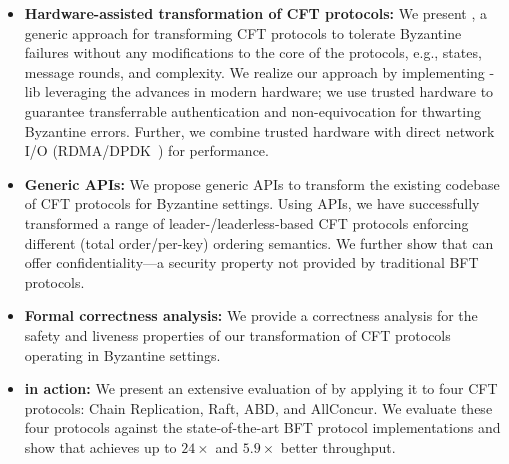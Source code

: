 \begin{itemize}[leftmargin=*]
    \item {\bf Hardware-assisted transformation of CFT protocols:} We present \projecttitle{}, a generic approach for transforming CFT protocols to tolerate Byzantine failures without any modifications to the core of the protocols, e.g., states, message rounds, and complexity. We realize our approach by implementing \projecttitle{}-lib leveraging the advances in modern hardware; we use trusted hardware to guarantee transferrable authentication and non-equivocation for thwarting Byzantine errors. Further, we combine trusted hardware with direct network I/O (RDMA/DPDK~\cite{rdma, dpdk}) for performance.

    \item {\bf Generic \projecttitle{} APIs:} We propose generic \projecttitle{} APIs to transform the existing codebase of CFT protocols for Byzantine settings. Using \projecttitle{} APIs, we have successfully
transformed a range of leader-/leaderless-based CFT protocols enforcing different (total order/per-key) ordering semantics.  We further show that \projecttitle{} can offer confidentiality---a security property not provided by traditional BFT protocols.

    
    \item {\bf Formal correctness analysis:}  We provide a correctness analysis for the safety and liveness properties of our
transformation of CFT protocols operating in Byzantine settings. %
    \item {\bf \projecttitle{} in action:} We present an extensive evaluation of \projecttitle{} by applying it to four CFT protocols: Chain Replication, Raft, ABD, and AllConcur. We evaluate these four protocols against the state-of-the-art BFT protocol implementations and show that \projecttitle{} achieves up to $24\times$ and $5.9\times$ better throughput.
    
\end{itemize}

